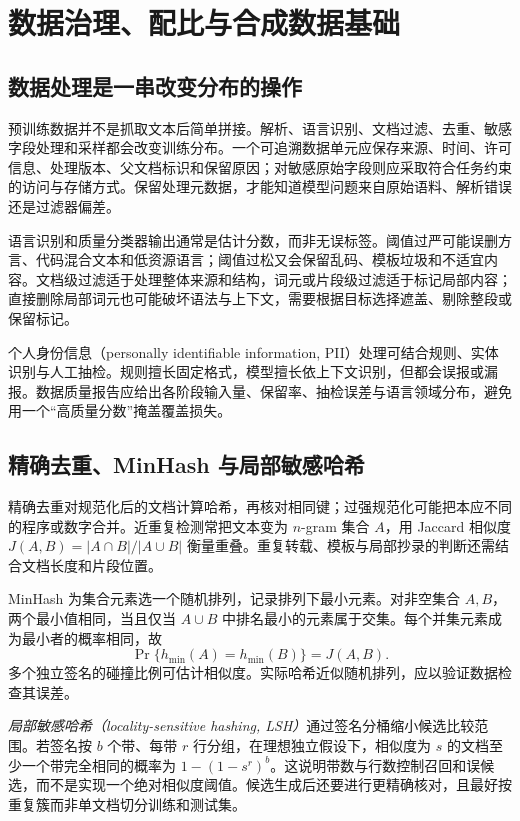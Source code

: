 \setcounter{chapter}{6} %
\chapter{数据治理、配比与合成数据基础}
\label{ch:data}

\section{数据处理是一串改变分布的操作}

预训练数据并不是抓取文本后简单拼接。解析、语言识别、文档过滤、去重、敏感字段处理和采样都会改变训练分布。一个可追溯数据单元应保存来源、时间、许可信息、处理版本、父文档标识和保留原因；对敏感原始字段则应采取符合任务约束的访问与存储方式。保留处理元数据，才能知道模型问题来自原始语料、解析错误还是过滤器偏差。

语言识别和质量分类器输出通常是估计分数，而非无误标签。阈值过严可能误删方言、代码混合文本和低资源语言；阈值过松又会保留乱码、模板垃圾和不适宜内容。文档级过滤适于处理整体来源和结构，词元或片段级过滤适于标记局部内容；直接删除局部词元也可能破坏语法与上下文，需要根据目标选择遮盖、剔除整段或保留标记。

个人身份信息（personally identifiable information, PII）处理可结合规则、实体识别与人工抽检。规则擅长固定格式，模型擅长依上下文识别，但都会误报或漏报。数据质量报告应给出各阶段输入量、保留率、抽检误差与语言领域分布，避免用一个“高质量分数”掩盖覆盖损失。

\section{精确去重、MinHash 与局部敏感哈希}

精确去重对规范化后的文档计算哈希，再核对相同键；过强规范化可能把本应不同的程序或数字合并。近重复检测常把文本变为 $n$-gram 集合 $A$，用 Jaccard 相似度 $J(A,B)=|A\cap B|/|A\cup B|$ 衡量重叠。重复转载、模板与局部抄录的判断还需结合文档长度和片段位置。

MinHash 为集合元素选一个随机排列，记录排列下最小元素。对非空集合 $A,B$，两个最小值相同，当且仅当 $A\cup B$ 中排名最小的元素属于交集。每个并集元素成为最小者的概率相同，故
\[
\Pr\{h_{\min}(A)=h_{\min}(B)\}=J(A,B).
\]
多个独立签名的碰撞比例可估计相似度。实际哈希近似随机排列，应以验证数据检查其误差。

\emph{局部敏感哈希（locality-sensitive hashing, LSH）}通过签名分桶缩小候选比较范围。若签名按 $b$ 个带、每带 $r$ 行分组，在理想独立假设下，相似度为 $s$ 的文档至少一个带完全相同的概率为 $1-(1-s^r)^b$。这说明带数与行数控制召回和误候选，而不是实现一个绝对相似度阈值。候选生成后还要进行更精确核对，且最好按重复簇而非单文档切分训练和测试集。

